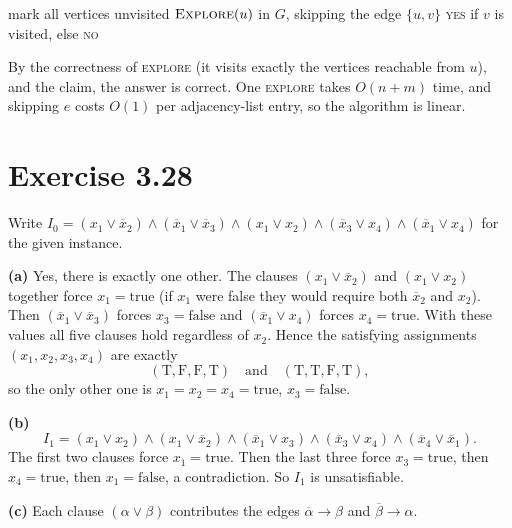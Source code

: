 \documentclass[11pt]{article}
\newcommand{\neglit}[1]{\overline{#1}}
\theoremstyle{definition}
\begin{document}
\begin{algorithm}[H]
\caption{Is there a cycle through $e=\{u,v\}$?}
\begin{algorithmic}[1]
  \State mark all vertices unvisited
  \State $\Call{Explore}{u}$ in $G$, skipping the edge $\{u,v\}$ 
  \State \Return \textsc{yes} if $v$ is visited, else \textsc{no}
\EndFunction
\end{algorithmic}
\end{algorithm}

By the correctness of \textsc{explore} (it visits exactly the vertices reachable from $u$), and the claim, the
answer is correct. One \textsc{explore} takes $O(n+m)$ time, and skipping $e$ costs $O(1)$ per adjacency-list
entry, so the algorithm is linear.

\section*{Exercise 3.28}

Write $I_0=(x_1\vee\neglit{x}_2)\wedge(\neglit{x}_1\vee\neglit{x}_3)\wedge(x_1\vee x_2)\wedge(\neglit{x}_3\vee x_4)
\wedge(\neglit{x}_1\vee x_4)$ for the given instance.

\textbf{(a)} Yes, there is exactly one other. The clauses $(x_1\vee\neglit{x}_2)$ and $(x_1\vee x_2)$ together force
$x_1=\text{true}$ (if $x_1$ were false they would require both $\neglit{x}_2$ and $x_2$). Then
$(\neglit{x}_1\vee\neglit{x}_3)$ forces $x_3=\text{false}$ and $(\neglit{x}_1\vee x_4)$ forces
$x_4=\text{true}$. With these values all five clauses hold regardless of $x_2$. Hence the satisfying assignments
$(x_1,x_2,x_3,x_4)$ are exactly
\[
  (\text{T},\text{F},\text{F},\text{T})\quad\text{and}\quad(\text{T},\text{T},\text{F},\text{T}),
\]
so the only other one is $x_1=x_2=x_4=\text{true}$, $x_3=\text{false}$.

\textbf{(b)}
\[
  I_1=(x_1\vee x_2)\wedge(x_1\vee\neglit{x}_2)\wedge(\neglit{x}_1\vee x_3)\wedge(\neglit{x}_3\vee x_4)\wedge
  (\neglit{x}_4\vee\neglit{x}_1).
\]
The first two clauses force $x_1=\text{true}$. Then the last three force $x_3=\text{true}$, then
$x_4=\text{true}$, then $x_1=\text{false}$, a contradiction. So $I_1$ is unsatisfiable.

\textbf{(c)} Each clause $(\alpha\vee\beta)$ contributes the edges $\neglit\alpha\to\beta$ and
$\neglit\beta\to\alpha$.
\end{document}
